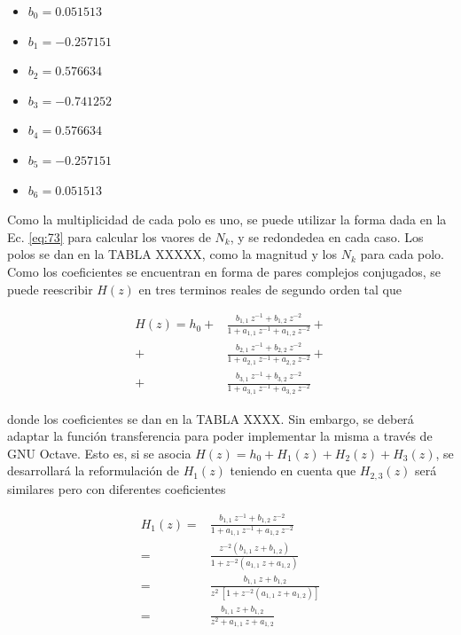     \begin{itemize}
      \item $b_{0} = 0.051513$
      \item $b_{1} = -0.257151$
      \item $b_{2} = 0.576634$
      \item $b_{3} = -0.741252$
      \item $b_{4} = 0.576634$
      \item $b_{5} = -0.257151$
      \item $b_{6} = 0.051513$
    \end{itemize}

     Como la multiplicidad de cada polo es uno, se puede utilizar la forma dada
     en la Ec. \ref{eq:73} para calcular los vaores de $N_{k}$, y se redondedea
     en cada caso. Los polos se dan en la TABLA XXXXX, como la magnitud y los
     $N_{k}$ para cada polo. Como los coeficientes se encuentran en forma
     de pares complejos conjugados, se puede reescribir $H(z)$ en tres terminos
     reales de segundo orden tal que

     \begin{equation}
       \begin{aligned}
         H(z) = h_{0} +& \frac{b_{1,1} \: z^{-1} + b_{1,2} \: z^{-2}}{1 + a_{1,1} \: z^{-1} + a_{1,2} \: z^{-2}} +\\
         +& \frac{b_{2,1} \: z^{-1} + b_{2,2} \: z^{-2}}{1 + a_{2,1} \: z^{-1} + a_{2,2} \: z^{-2}} + \\
         +& \frac{b_{3,1} \: z^{-1} + b_{3,2} \: z^{-2}}{1 + a_{3,1} \: z^{-1} + a_{3,2} \: z^{-2}}
       \end{aligned}
     \end{equation}

     donde los coeficientes se dan en la TABLA XXXX. Sin embargo, se deberá
     adaptar la función transferencia para poder implementar la misma a través
     de GNU Octave. Esto es, si se asocia
     $H(z) = h_{0} + H_{1}(z) + H_{2}(z) + H_{3}(z)$, se desarrollará la
     reformulación de $H_{1}(z)$ teniendo en cuenta que $H_{2,3}(z)$ será
     similares pero con diferentes coeficientes

     \begin{equation}
       \begin{aligned}
         H_{1}(z) =& \frac{b_{1,1} \: z^{-1} + b_{1,2} \: z^{-2}}{1 + a_{1,1} \: z^{-1} + a_{1,2} \: z^{-2}} \\
         =& \frac{z^{-2} \left( b_{1,1} \: z + b_{1,2} \right)}{1 + z^{-2} \left( a_{1,1} \: z + a_{1,2} \right)} \\
         =& \frac{b_{1,1} \: z + b_{1,2}}{z^{2} \: \left[1 + z^{-2} \left( a_{1,1} \: z + a_{1,2} \right) \right]} \\
         =& \frac{b_{1,1} \: z + b_{1,2}}{z^{2} + a_{1,1} \: z + a_{1,2}}
       \end{aligned}
     \end{equation}

